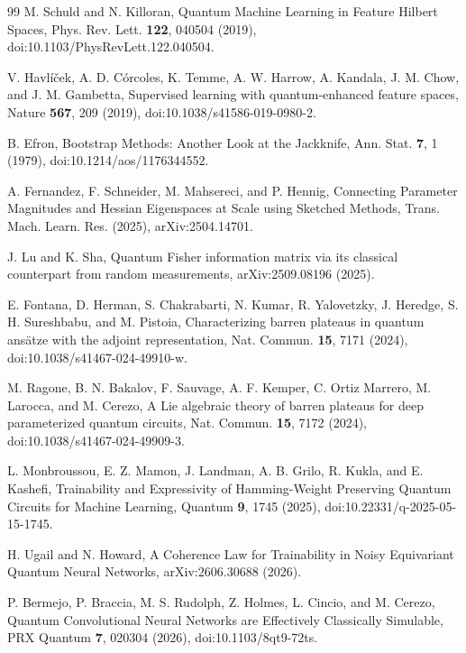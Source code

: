 \documentclass[aps,prx,reprint,superscriptaddress,nofootinbib,longbibliography]{revtex4-2}
\begin{document}
\begin{thebibliography}{99}
M. Schuld and N. Killoran,
Quantum Machine Learning in Feature Hilbert Spaces,
Phys. Rev. Lett. \textbf{122}, 040504 (2019),
doi:10.1103/PhysRevLett.122.040504.

V. Havl\'{i}\v{c}ek, A. D. C\'{o}rcoles, K. Temme, A. W. Harrow, A. Kandala, J. M. Chow, and J. M. Gambetta,
Supervised learning with quantum-enhanced feature spaces,
Nature \textbf{567}, 209 (2019),
doi:10.1038/s41586-019-0980-2.

B. Efron,
Bootstrap Methods: Another Look at the Jackknife,
Ann. Stat. \textbf{7}, 1 (1979),
doi:10.1214/aos/1176344552.



A. Fernandez, F. Schneider, M. Mahsereci, and P. Hennig,
Connecting Parameter Magnitudes and Hessian Eigenspaces at Scale using Sketched Methods,
Trans. Mach. Learn. Res. (2025), arXiv:2504.14701.

J. Lu and K. Sha,
Quantum Fisher information matrix via its classical counterpart from random measurements,
arXiv:2509.08196 (2025).

E. Fontana, D. Herman, S. Chakrabarti, N. Kumar, R. Yalovetzky, J. Heredge,
S. H. Sureshbabu, and M. Pistoia,
Characterizing barren plateaus in quantum ans\"atze with the adjoint representation,
Nat. Commun. \textbf{15}, 7171 (2024),
doi:10.1038/s41467-024-49910-w.

M. Ragone, B. N. Bakalov, F. Sauvage, A. F. Kemper, C. Ortiz Marrero,
M. Larocca, and M. Cerezo,
A Lie algebraic theory of barren plateaus for deep parameterized quantum circuits,
Nat. Commun. \textbf{15}, 7172 (2024),
doi:10.1038/s41467-024-49909-3.

L. Monbroussou, E. Z. Mamon, J. Landman, A. B. Grilo, R. Kukla, and E. Kashefi,
Trainability and Expressivity of Hamming-Weight Preserving Quantum Circuits for Machine Learning,
Quantum \textbf{9}, 1745 (2025),
doi:10.22331/q-2025-05-15-1745.

H. Ugail and N. Howard,
A Coherence Law for Trainability in Noisy Equivariant Quantum Neural Networks,
arXiv:2606.30688 (2026).

P. Bermejo, P. Braccia, M. S. Rudolph, Z. Holmes, L. Cincio, and M. Cerezo,
Quantum Convolutional Neural Networks are Effectively Classically Simulable,
PRX Quantum \textbf{7}, 020304 (2026),
doi:10.1103/8qt9-72ts.


\end{thebibliography}
\end{document}
